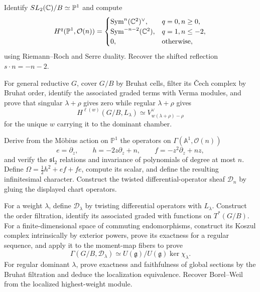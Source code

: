 \begin{exercise}
Identify $SL_2(\mathbb C)/B\simeq\mathbb P^1$ and compute
\[
 H^q(\mathbb P^1,\mathcal O(n))=
 \begin{cases}
  \operatorname{Sym}^n(\mathbb C^2)^\vee,&q=0, n\ge0,\\
  \operatorname{Sym}^{-n-2}(\mathbb C^2),&q=1, n\le-2,\\
  0,&\text{otherwise},
 \end{cases}
\]
using Riemann--Roch and Serre duality.  Recover the shifted reflection
$s\mathbin\cdot n=-n-2$.
\end{exercise}

\begin{exercise}
For general reductive $G$, cover $G/B$ by Bruhat
cells, filter its \v Cech complex by Bruhat order, identify the associated
graded terms with Verma modules, and prove that singular $\lambda+\rho$ gives
zero while regular $\lambda+\rho$ gives
\[
 H^{\ell(w)}(G/B,L_\lambda)
 \simeq V_{w(\lambda+\rho)-\rho}^\vee
\]
for the unique $w$ carrying it to the dominant chamber.
\end{exercise}

\begin{exercise}
Derive from the M\"obius action on $\mathbb P^1$ the operators on
$\Gamma(\mathbb A^1,\mathcal O(n))$
\[
 e=\partial_z,\qquad h=-2z\partial_z+n,\qquad
 f=-z^2\partial_z+nz,
\]
and verify the $\mathfrak{sl}_2$ relations and invariance of polynomials of
degree at most $n$.  Define
$\Omega=\tfrac12h^2+ef+fe$, compute its scalar, and define the resulting
infinitesimal character.  Construct the twisted differential-operator sheaf
$\mathcal D_n$ by gluing the displayed chart operators.
\end{exercise}

\begin{exercise}
For a weight $\lambda$, define $\mathcal D_\lambda$ by twisting differential
operators with $L_\lambda$.  Construct the order filtration, identify its
associated graded with functions
on $T^*(G/B)$.  For a finite-dimensional space of commuting endomorphisms,
construct its Koszul complex intrinsically by exterior powers, prove its
exactness for a regular sequence, and apply it to the moment-map fibers to
prove
\[
 \Gamma(G/B,\mathcal D_\lambda)
 \simeq U(\mathfrak g)/U(\mathfrak g)\ker\chi_\lambda.
\]
For regular dominant $\lambda$, prove exactness and faithfulness of global
sections by the Bruhat filtration and deduce the localization equivalence.
Recover Borel--Weil from the localized highest-weight module.
\end{exercise}

